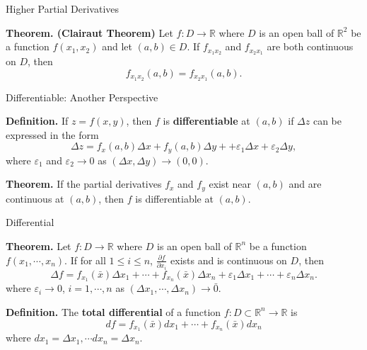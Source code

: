 \documentclass{beamer}
\begin{document}
    \begin{frame}[t]{Higher Partial Derivatives}
        \begin{block}
            \par \textbf{Theorem. (Clairaut Theorem)} Let $f: D \to \mathbb{R}$ where $D$ is an open ball of $\mathbb{R}^2$ be a function $f(x_1, x_2)$ and let $(a,b) \in D$. If $f_{x_1x_2}$ and $f_{x_2x_1}$ are both continuous on $D$, then 
            \begin{equation*}
                f_{x_1x_2} (a,b) = f_{x_2x_1} (a,b).
            \end{equation*}
        \end{block}

        \begin{block}{Differentiable: Another Perspective}
            \par \textbf{Definition.} If $z = f(x,y)$, then $f$ is \textbf{differentiable} at $(a,b)$ if $\Delta z$ can be expressed in the form 
            \begin{equation*}
                \Delta z = f_x(a,b) \Delta x + f_y(a,b) \Delta y ++ \varepsilon_1 \Delta x + \varepsilon_2 \Delta y,
            \end{equation*}
            where $\varepsilon_1$ and $\varepsilon_2 \to 0$ as $(\Delta x, \Delta y) \to (0,0)$.

            \par \textbf{Theorem.} If the partial derivatives $f_x$ and $f_y$ exist near $(a,b)$ and are continuous at $(a,b)$, then $f$ is differentiable at $(a,b)$.
        \end{block}
    \end{frame}

    \begin{frame}[t]{Differential}
        \begin{block}
            \par \textbf{Theorem.} Let $f: D \to \mathbb{R}$ where $D$ is an open ball of $\mathbb{R}^n$ be a function $f(x_1,\cdots, x_n)$. If for all $1 \leq i \leq n$, $\frac{\partial f}{\partial x_i}$ exists and is continuous on $D$, then 
            \begin{equation*}
                \Delta f = f_{x_1} (\bar{x}) \Delta x_1 + \cdots + f_{x_n} (\bar{x}) \Delta x_n + \varepsilon_1 \Delta x_1 + \cdots + \varepsilon_n \Delta x_n.
            \end{equation*}
            where $\varepsilon_i \to 0$, $i = 1, \cdots, n$ as $(\Delta x_1, \cdots, \Delta x_n) \to \bar{0}$.
        \end{block}
        \begin{block}
            \par \textbf{Definition.} The \textbf{total differential} of a function $f:D \subset \mathbb{R}^n \to \mathbb{R}$ is 
            \begin{equation*}
                df = f_{x_1} (\bar{x}) d x_1 + \cdots + f_{x_n} (\bar{x}) d x_n
            \end{equation*}
            where $dx_1 = \Delta x_1, \cdots dx_n = \Delta x_n$. 
        \end{block}
    \end{frame}
    
\end{document}

